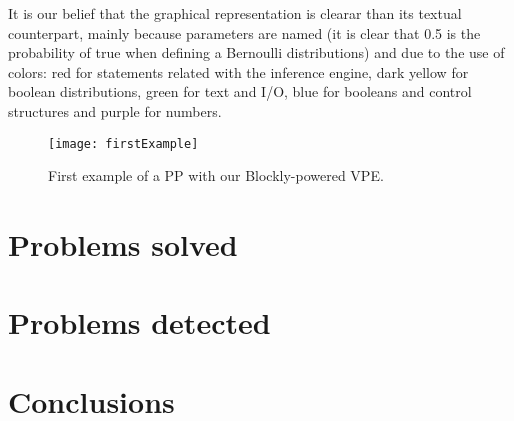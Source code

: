 It is our belief that the graphical representation is clearar than its textual
counterpart, mainly because parameters are named (it is clear that 0.5 is the
probability of true when defining a Bernoulli distributions) and due to the use
of colors: red for statements related with
the inference engine, dark yellow for boolean distributions, green for text
and I/O, blue for booleans and control structures and purple for numbers.

\begin{figure}[t]
  \begin{center}
    \leavevmode
    \texttt{[image: firstExample]}
    \caption{First example of a PP with our Blockly-powered VPE.}
    \label{fig:firstExample}
  \end{center}
\end{figure}

\section{Problems solved}

\section{Problems detected}

\section{Conclusions}
